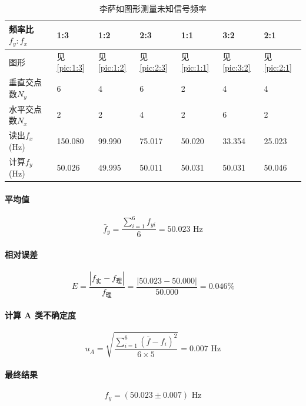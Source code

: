 \documentclass[]{../../templates/Report}%
\begin{document}
\begin{table}[H]
\centering
\caption{李萨如图形测量未知信号频率}
\label{tab:li_freq}
\begin{tabular}{|L{0.2\textwidth}|L{0.08\textwidth}|L{0.08\textwidth}|L{0.08\textwidth}|L{0.08\textwidth}|L{0.08\textwidth}|L{0.08\textwidth}|}
\hline
频率比$f_y:f_x$ & 1:3     & 1:2     & 2:3    & 1:1    & 3:2    & 2:1    \\ \hline
图形           & 见\cref{pic:1:3}       & 见\cref{pic:1:2}       & 见\cref{pic:2:3}      & 见\cref{pic:1:1}      & 见\cref{pic:3:2}      & 见\cref{pic:2:1}      \\ \hline
垂直交点数$N_y$   & 6       & 4       & 6      & 2      & 4      & 4      \\ \hline
水平交点数$N_x$   & 2       & 2       & 4      & 2      & 6      & 2      \\ \hline
读出$f_x$(\si{\hertz})      & 150.080 & 99.990 & 75.017 & 50.020 & 33.354 & 25.023 \\ \hline
计算$f_y$(\si{\hertz})      & 50.026  & 49.995  & 50.011 & 50.031 & 50.031 & 50.046 \\ \hline
\end{tabular}
\end{table}
\paragraph{平均值}
\begin{equation*}
    \bar{f}_y = \frac{\sum_{i=1}^{6} f_{yi}}{6} = 50.023 \text{ Hz}
\end{equation*}

\paragraph{相对误差}
\begin{equation*}
    E = \frac{|f_{\text{实}} - f_{\text{理}}|}{f_{\text{理}}} = \frac{|50.023 - 50.000|}{50.000} = 0.046\%
\end{equation*}

\paragraph{计算 A 类不确定度}
\begin{equation*}
    u_A = \sqrt{\frac{\sum_{i=1}^{6} (\bar{f} - f_i)^2}{6 \times 5}} = 0.007 \text{ Hz}
\end{equation*}


\paragraph{最终结果}
\begin{equation*}
    f_y = (50.023 \pm 0.007) \text{ Hz}
\end{equation*}
\end{document}
